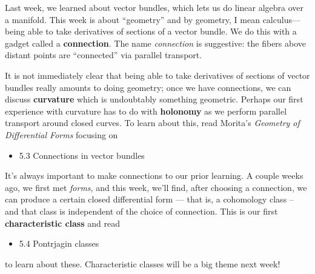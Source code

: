 \documentclass{homework}
\author{Jim Fowler}
\date{Week 12: Geometry}
\begin{document}
\maketitle

Last week, we learned about vector bundles, which lets us do linear
algebra over a manifold.  This week is about ``geometry'' and by
geometry, I mean calculus---being able to take derivatives of sections
of a vector bundle.  We do this with a gadget called a
\textbf{connection}.  The name \textit{connection} is suggestive: the
fibers above distant points are ``connected'' via parallel transport.

It is not immediately clear that being able to take derivatives of
sections of vector bundles really amounts to doing geometry; once we
have connections, we can discuss \textbf{curvature} which is
undoubtably something geometric.  Perhaps our first experience with
curvature has to do with \textbf{holonomy} as we perform parallel
transport around closed curves.  To learn about this, read Morita's
\textit{Geometry of Differential Forms} focusing on
\begin{itemize}
\item 5.3 Connections in vector bundles
\end{itemize}

It's always important to make connections to our prior learning.  A couple weeks ago, we first met \textit{forms}, and this week, we'll find, after choosing a connection, we can produce a certain closed differential form --- that is, a cohomology class -- and that class is independent of the choice of connection.  This is our first \textbf{characteristic class} and read
\begin{itemize}
\item 5.4 Pontrjagin classes
\end{itemize}
to learn about these.  Characteristic classes will be a big theme next week!
\end{document}
